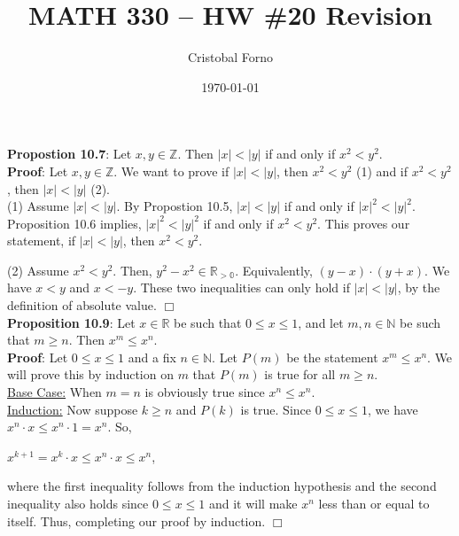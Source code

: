 \documentclass[12pt]{article}
\title{MATH 330 -- HW \#20 Revision}
\author{Cristobal Forno}
\date{\today}
\begin{document}
\maketitle

\noindent
\textbf{Propostion 10.7}: Let $x, y \in \mathbb{Z}$. Then $|x| < |y|$ if and
only if $x^2 < y^2$.\\

\noindent
\textbf{Proof}:
Let $x, y \in \mathbb{Z}$. We want to prove if $|x| < |y|$, then $x^2 < y^2$ (1)
and if $x^2 < y^2$, then $|x| < |y|$ (2).\\
\indent
(1) Assume $|x| < |y|$. By Propostion 10.5, $|x| < |y|$ if and only if $|x|^2 <
|y|^2$. Proposition 10.6 implies, $|x|^2 < |y|^2 $ if and only if $ x^2 < y^2$. This proves our statement, if $|x| < |y|$, then $x^2 < y^2$.

\indent
(2) Assume $x^2 < y^2$. Then, $y^2 - x^2 \in \mathbb{R_{> 0}}$. Equivalently,
$(y-x) \cdot (y+x)$. We have $x < y$ and $x < -y$. These two inequalities can
only hold if $|x| < |y|$, by the definition of absolute value. $\Box$ \\

\noindent
\textbf{Proposition 10.9}: Let $x \in \mathbb{R}$ be such that $0 \leq x \leq
1$, and let $m,n \in \mathbb{N}$ be such that $m \geq n$. Then $x^m \leq x^n$.\\

\noindent
\textbf{Proof}:
Let $0 \leq x \leq 1$ and a fix $n \in \mathbb{N}$. Let $P(m)$ be the statement
$x^m \leq x^n$. We will prove this by induction on $m$ that $P(m)$ is true for
all $m \geq n$. \\
\indent
\underline{Base Case:} When $m = n$ is obviously true since $x^n \leq x^n$.\\
\indent
\underline{Induction:} Now suppose $k \geq n$ and $P(k)$ is true. Since $0 \leq
x \leq 1$, we have $x^n \cdot x \leq x^n \cdot 1 = x^n$. So,
\begin{center}
  $x^{k+1} = x^k \cdot x \leq x^n \cdot x \leq x^n$,
\end{center}
where the first inequality follows from the induction hypothesis and the second
inequality also holds since $0 \leq
x \leq 1$ and it will make $x^n$ less than or equal to itself. Thus, completing our
proof by induction. $\Box$
\end{document}
